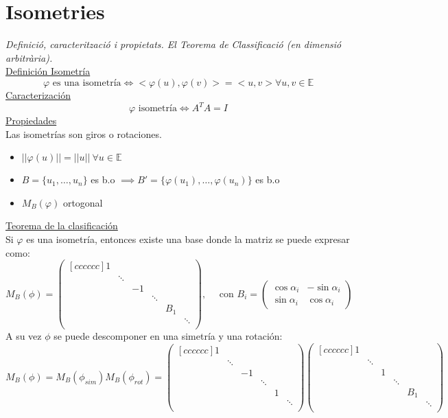 \documentclass{article}
\newcommand{\E}{\mathbb{E}}
\newcommand{\h}{\hspace{1em}}
\renewcommand{\t}[1]{\text{#1}}
\newcommand{\norm}[1]{\lvert\lvert #1 \rvert\rvert}
\begin{document}
\section{Isometries}
\textit{Definició, caracterització i propietats. El Teorema de Classificació (en
dimensió arbitrària).} \\
\underline{Definición Isometría} \\
\[\varphi \t{ es una isometría} \iff <\varphi(u), \varphi(v)> = <u, v> \forall u, v \in \E\]
\underline{Caracterización} \\
$$
\varphi \text{ isometría} \iff A^TA = I
$$
\underline{Propiedades} \\
Las isometrías son giros o rotaciones.
\begin{itemize}
    \item $\norm{\varphi(u)} = \norm{u} \ \forall u\in \E$
    \item $B= \{u_1,\ldots, u_n\}$ es b.o $\implies B'= \{\varphi(u_1),\ldots, \varphi(u_n)\}$ es b.o
    \item $M_B(\varphi)$ ortogonal
\end{itemize}
\underline{Teorema de la clasificación} \\
Si $\varphi$ es una isometría, entonces existe una base donde la matriz se puede expresar como:
\[
M_B(\phi)=\begin{pmatrix}[cccccc]
    1 &  &  &  &  &  \\
     & \ddots &  &  &  &  \\
     &  & -1 &  &  &  \\
     &  &  & \ddots &  &  \\
     &  &  &  & \boxed{B_1} &  \\
     &  &  &  &  & \ddots \\
\end{pmatrix}, \h \t{ con } \boxed{B_i} = 
\begin{pmatrix}
    \cos\alpha_i & -\sin\alpha_i \\
    \sin\alpha_i & \cos\alpha_i
\end{pmatrix}
\]
A su vez $\phi$ se puede descomponer en una simetría y una rotación:
\[M_B(\phi) = M_B(\phi_{sim})M_B(\phi_{rot})= 
\begin{pmatrix}[cccccc]
    1 &  &  &  &  &  \\
     & \ddots &  &  &  &  \\
     &  & -1 &  &  &  \\
     &  &  & \ddots &  &  \\
     &  &  &  & 1 &  \\
     &  &  &  &  & \ddots \\
\end{pmatrix}
\begin{pmatrix}[cccccc]
    1 &  &  &  &  &  \\
     & \ddots &  &  &  &  \\
     &  & 1 &  &  &  \\
     &  &  & \ddots &  &  \\
     &  &  &  & \boxed{B_1} &  \\
     &  &  &  &  & \ddots \\
\end{pmatrix}\]
\end{document}
